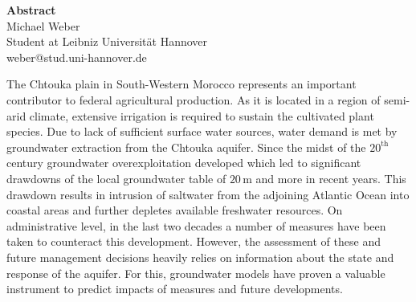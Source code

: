 \thispagestyle{plain}
\begin{center}
    \LARGE
    \textbf{Abstract}\\
    \vspace{1cm}
    \hspace{0pt}
    \large
    Michael Weber \\
    \vspace{0.5cm}
    \small
    Student at Leibniz Universität Hannover\\
    weber@stud.uni-hannover.de

    \vspace{0.7cm}
\end{center}

\normalsize
The Chtouka plain in South-Western Morocco represents an important contributor to federal agricultural production. As it is located in a region of semi-arid climate, extensive irrigation is required to sustain the cultivated plant species. Due to lack of sufficient surface water sources, water demand is met by groundwater extraction from the Chtouka aquifer. Since the midst of the $20^\textrm{th}$ century groundwater overexploitation developed which led to significant drawdowns of the local groundwater table of $20 \, \textrm{m}$ and more in recent years. This drawdown results in intrusion of saltwater from the adjoining Atlantic Ocean into coastal areas and further depletes available freshwater resources. On administrative level, in the last two decades a number of measures have been taken to counteract this development. However, the assessment of these and future management decisions heavily relies on information about the state and response of the aquifer. For this, groundwater models have proven a valuable instrument to predict impacts of measures and future developments.


